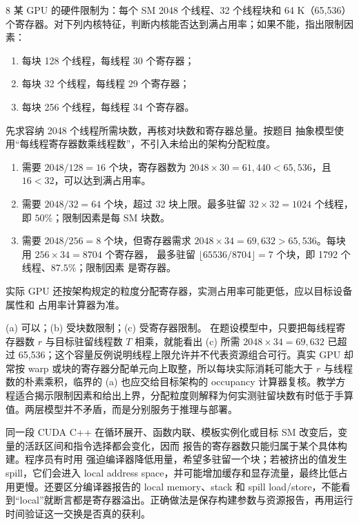 \begin{solutionexercise}{8}
\problemheading 某 GPU 的硬件限制为：每个 SM 2048 个线程、32 个线程块和 64 K（65,536）
个寄存器。对下列内核特征，判断内核能否达到满占用率；如果不能，指出限制因素：
\begin{enumerate}[label=\alph*.,leftmargin=2.2em]
  \item 每块 128 个线程，每线程 30 个寄存器；
  \item 每块 32 个线程，每线程 29 个寄存器；
  \item 每块 256 个线程，每线程 34 个寄存器。
\end{enumerate}

\approachheading 先求容纳 2048 个线程所需块数，再核对块数和寄存器总量。按题目
抽象模型使用“每线程寄存器数乘线程数”，不引入未给出的架构分配粒度。

\answerheading
\begin{enumerate}[label=\alph*.,leftmargin=2.2em]
\item 需要 $2048/128=16$ 个块，寄存器数为
$2048\times30=61{,}440<65{,}536$，且 $16<32$，可以达到满占用率。
\item 需要 $2048/32=64$ 个块，超过 32 块上限。最多驻留
$32\times32=1024$ 个线程，即 $50\%$；限制因素是每 SM 块数。
\item 需要 $2048/256=8$ 个块，但寄存器需求
$2048\times34=69{,}632>65{,}536$。每块用 $256\times34=8704$ 个寄存器，
最多驻留 $\lfloor65536/8704\rfloor=7$ 个块，即 1792 个线程、$87.5\%$；限制因素
是寄存器。
\end{enumerate}

实际 GPU 还按架构规定的粒度分配寄存器，实测占用率可能更低，应以目标设备属性和
占用率计算器为准。

\conclusionheading (a) 可以；(b) 受块数限制；(c) 受寄存器限制。
\discussionheading
{}
在题设模型中，只要把每线程寄存器数 $r$ 与目标驻留线程数 $T$ 相乘，就能看出 (c) 所需 $2048\times34=69{,}632$ 已超过 65,536；这个容量反例说明线程上限允许并不代表资源组合可行。真实 GPU 却常按 warp 或块的寄存器分配单元向上取整，所以每块实际消耗可能大于 $r$ 与线程数的朴素乘积，临界的 (a) 也应交给目标架构的 occupancy 计算器复核。教学方程适合揭示限制因素和给出上界，分配粒度则解释为何实测驻留块数有时低于手算值。两层模型并不矛盾，而是分别服务于推理与部署。

同一段 CUDA C++ 在循环展开、函数内联、模板实例化或目标 SM 改变后，变量的活跃区间和指令选择都会变化，因而  报告的寄存器数只能归属于某个具体构建。程序员有时用  强迫编译器降低用量，希望多驻留一个块；若被挤出的值发生 spill，它们会进入 local address space，并可能增加缓存和显存流量，最终比低占用更慢。还要区分编译器报告的 local memory、stack 和 spill load/store，不能看到“local”就断言都是寄存器溢出。正确做法是保存构建参数与资源报告，再用运行时间验证这一交换是否真的获利。


\end{solutionexercise}
